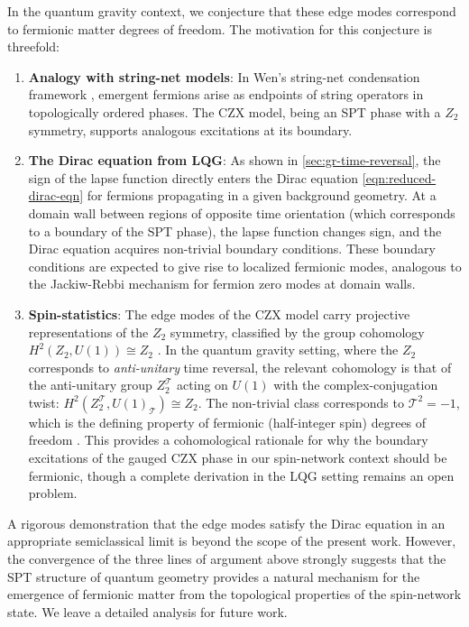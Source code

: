 \documentclass[preprint]{SciPost}
\newcommand{\mc}[1]{\mathcal{#1}}
\theoremstyle{plain} %
\begin{document}
In the quantum gravity context, we conjecture that these edge modes correspond to fermionic matter degrees of freedom. The motivation for this conjecture is threefold:

\begin{enumerate}
	\item \textbf{Analogy with string-net models}: In Wen's string-net condensation framework \cite{Wen2002aQuantum,Levin2004String-net}, emergent fermions arise as endpoints of string operators in topologically ordered phases. The CZX model, being an SPT phase with a $ Z_2 $ symmetry, supports analogous excitations at its boundary.

	\item \textbf{The Dirac equation from LQG}: As shown in \autoref{sec:gr-time-reversal}, the sign of the lapse function directly enters the Dirac equation \eqref{eqn:reduced-dirac-eqn} for fermions propagating in a given background geometry. At a domain wall between regions of opposite time orientation (which corresponds to a boundary of the SPT phase), the lapse function changes sign, and the Dirac equation acquires non-trivial boundary conditions. These boundary conditions are expected to give rise to localized fermionic modes, analogous to the Jackiw-Rebbi mechanism for fermion zero modes at domain walls.

	\item \textbf{Spin-statistics}: The edge modes of the CZX model carry projective representations of the $ Z_2 $ symmetry, classified by the group cohomology $ H^2(Z_2, U(1)) \cong Z_2 $ \cite{Chen2011Symmetry}. In the quantum gravity setting, where the $ Z_2 $ corresponds to \emph{anti-unitary} time reversal, the relevant cohomology is that of the anti-unitary group $ Z_2^{\mc{T}} $ acting on $ U(1) $ with the complex-conjugation twist: $ H^2(Z_2^{\mc{T}}, U(1)_{\mc{T}}) \cong Z_2 $. The non-trivial class corresponds to $ \mc{T}^2 = -1 $, which is the defining property of fermionic (half-integer spin) degrees of freedom \cite{Chen2011Symmetry,Kapustin2014Symmetry}. This provides a cohomological rationale for why the boundary excitations of the gauged CZX phase in our spin-network context should be fermionic, though a complete derivation in the LQG setting remains an open problem.
\end{enumerate}

A rigorous demonstration that the edge modes satisfy the Dirac equation in an appropriate semiclassical limit is beyond the scope of the present work. However, the convergence of the three lines of argument above strongly suggests that the SPT structure of quantum geometry provides a natural mechanism for the emergence of fermionic matter from the topological properties of the spin-network state. We leave a detailed analysis for future work.
\end{document}
